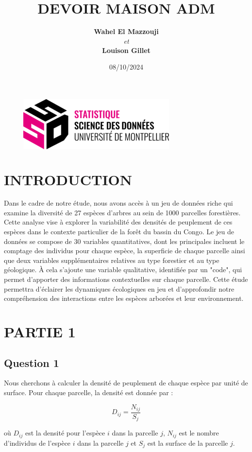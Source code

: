 \documentclass[a4paper,12pt]{article}
\title{\textbf{DEVOIR MAISON ADM}}
\author{\textbf{Wahel El Mazzouji} \\ \textit{et} \\ \textbf{Louison Gillet}}
\date{08/10/2024}
\begin{document}
\maketitle
\begin{figure}[h!]
    \centering
    \includegraphics[width=0.5\linewidth]{ssd.png}
\end{figure}

\newpage
\tableofcontents
\listoffigures
\newpage

\section{INTRODUCTION}
Dans le cadre de notre étude, nous avons accès à un jeu de données riche qui examine la diversité de 27 espèces d'arbres au sein de 1000 parcelles forestières. Cette analyse vise à explorer la variabilité des densités de peuplement de ces espèces dans le contexte particulier de la forêt du bassin du Congo.
Le jeu de données se compose de 30 variables quantitatives, dont les principales incluent le comptage des individus pour chaque espèce, la superficie de chaque parcelle ainsi que deux variables supplémentaires relatives au type forestier et au type géologique. À cela s’ajoute une variable qualitative, identifiée par un "code", qui permet d'apporter des informations contextuelles sur chaque parcelle.
Cette étude permettra d'éclairer les dynamiques écologiques en jeu et d'approfondir notre compréhension des interactions entre les espèces arborées et leur environnement.

\section{PARTIE 1}
\subsection{Question 1}
Nous cherchons à calculer la densité de peuplement de chaque espèce par unité de surface. Pour chaque parcelle, la densité est donnée par :

\[
D_{ij} = \frac{N_{ij}}{S_{j}}
\]

où \(D_{ij}\) est la densité pour l'espèce \(i\) dans la parcelle \(j\), \(N_{ij}\) est le nombre d'individus de l'espèce \(i\) dans la parcelle \(j\) et \(S_{j}\) est la surface de la parcelle \(j\).
\end{document}
